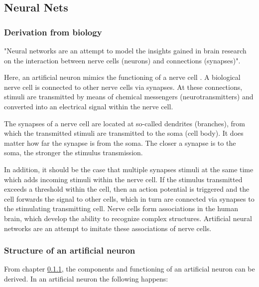 \subsection{Neural Nets}

\subsubsection{Derivation from biology}
\label{ss_nn_derivation_from_biology}

"Neural networks are an attempt to model the insights
gained in brain research on the interaction between nerve
cells (neurons) and connections (synapses)".\cite{ct_math}

Here, an artificial neuron mimics the functioning of a
nerve cell . A biological nerve cell is connected to other
nerve cells via synapses. At these connections, stimuli are
transmitted by means of chemical messengers
(neurotransmitters) and converted into an electrical signal
within the nerve cell.

The synapses of a nerve cell are located at so-called
dendrites (branches), from which the transmitted stimuli
are transmitted to the soma (cell body). It does matter how
far the synapse is from the soma. The closer a synapse is
to the soma, the stronger the stimulus transmission.\cite{%
bio,ct_math}

In addition, it should be the case that multiple synapses
stimuli at the same time which adds incoming stimuli within
the nerve cell.\cite{bio} If the stimulus transmitted
exceeds a threshold within the cell, then an action
potential is triggered and the cell forwards the signal to
other cells, which in turn are connected via synapses to
the stimulating transmitting cell. Nerve cells form
associations in the human brain, which develop the ability
to recognize complex structures. Artificial neural networks
are an attempt to imitate these associations of nerve
cells.\cite{ct_math}

\subsubsection{Structure of an artificial neuron}



From chapter \ref{ss_nn_derivation_from_biology}, the
components and functioning of an artificial neuron can be
derived.
\newline\newline
In an artificial neuron the following happens:

